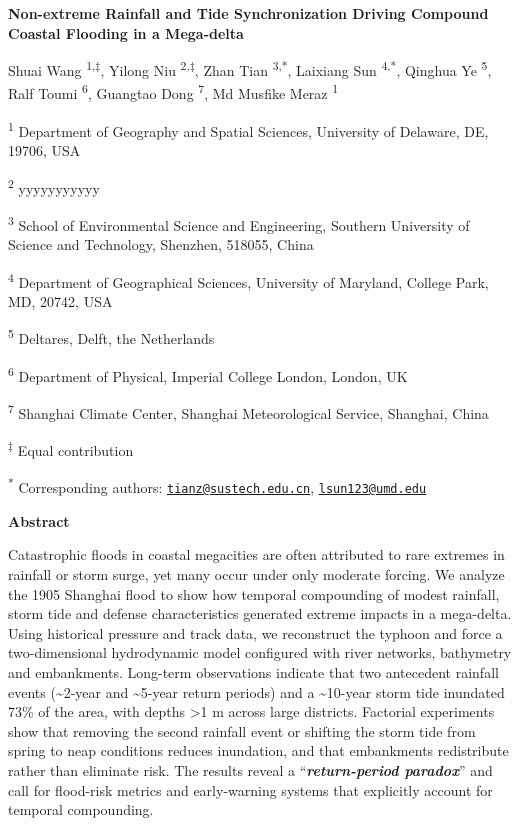 \documentclass[
]{article}
\author{}
\date{}
\begin{document}
\textbf{Non-extreme Rainfall and Tide Synchronization Driving Compound
Coastal Flooding in a Mega-delta}

Shuai Wang \textsuperscript{1,‡}, Yilong Niu \textsuperscript{2,‡}, Zhan
Tian \textsuperscript{3,*}, Laixiang Sun \textsuperscript{4,*}, Qinghua
Ye \textsuperscript{5}, Ralf Toumi \textsuperscript{6}, Guangtao Dong
\textsuperscript{7}, Md Musfike Meraz \textsuperscript{1}

\textsuperscript{1} Department of Geography and Spatial Sciences,
University of Delaware, DE, 19706, USA

\textsuperscript{2} yyyyyyyyyyy

\textsuperscript{3} School of Environmental Science and Engineering,
Southern University of Science and Technology, Shenzhen, 518055, China

\textsuperscript{4} Department of Geographical Sciences, University of
Maryland, College Park, MD, 20742, USA

\textsuperscript{5} Deltares, Delft, the Netherlands

\textsuperscript{6} Department of Physical, Imperial College London,
London, UK

\textsuperscript{7} Shanghai Climate Center, Shanghai Meteorological
Service, Shanghai, China

\textsuperscript{‡} Equal contribution

\textsuperscript{*} Corresponding authors:
\href{mailto:tianz@sustech.edu.cn}{\nolinkurl{tianz@sustech.edu.cn}},
\href{mailto:lsun123@umd.edu}{\nolinkurl{lsun123@umd.edu}}

\textbf{Abstract}

Catastrophic floods in coastal megacities are often attributed to rare
extremes in rainfall or storm surge, yet many occur under only moderate
forcing. We analyze the 1905 Shanghai flood to show how temporal
compounding of modest rainfall, storm tide and defense characteristics
generated extreme impacts in a mega-delta. Using historical pressure and
track data, we reconstruct the typhoon and force a two-dimensional
hydrodynamic model configured with river networks, bathymetry and
embankments. Long-term observations indicate that two antecedent
rainfall events (\textasciitilde2-year and \textasciitilde5-year return
periods) and a \textasciitilde10-year storm tide inundated 73\% of the
area, with depths \textgreater1 m across large districts. Factorial
experiments show that removing the second rainfall event or shifting the
storm tide from spring to neap conditions reduces inundation, and that
embankments redistribute rather than eliminate risk. The results reveal
a ``\emph{\textbf{return-period paradox}}'' and call for flood-risk
metrics and early-warning systems that explicitly account for temporal
compounding.
\end{document}
